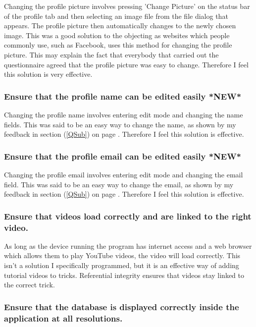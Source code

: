 Changing the profile picture involves pressing 'Change Picture' on the status bar of the profile tab and then selecting an image file from the file dialog that appears. The profile picture then automatically changes to the newly chosen image. This was a good solution to the objecting as websites which people commonly use, such as Facebook, uses this method for changing the profile picture. This may explain the fact that everybody that carried out the questionnaire agreed that the profile picture was easy to change. Therefore I feel this solution is very effective.

	\subsubsection{Ensure that the profile name can be edited easily *NEW*}

Changing the profile name involves entering edit mode and changing the name fields. This was said to be an easy way to change the name, as shown by my feedback in section (\ref{QSub}) on page \pageref{QSub}. Therefore I feel this solution is effective.

	\subsubsection{Ensure that the profile email can be edited easily *NEW*}

Changing the profile email involves entering edit mode and changing the email field. This was said to be an easy way to change the email, as shown by my feedback in section (\ref{QSub}) on page \pageref{QSub}. Therefore I feel this solution is effective.

	\subsubsection{Ensure that videos load correctly and are linked to the right video.}	

As long as the device running the program has internet access and a web browser which allows them to play YouTube videos, the video will load correctly. This isn't a solution I specifically programmed, but it is an effective way of adding tutorial videos to tricks. Referential integrity ensures that videos stay linked to the correct trick.



	\subsubsection{Ensure that the database is displayed correctly inside the application at all resolutions.}

